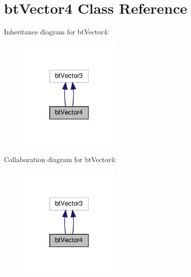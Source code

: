 \hypertarget{classbtVector4}{}\section{bt\+Vector4 Class Reference}
\label{classbtVector4}


Inheritance diagram for bt\+Vector4\+:
\nopagebreak
\begin{figure}[H]
\begin{center}
\leavevmode
\includegraphics[width=139pt]{classbtVector4__inherit__graph}
\end{center}
\end{figure}


Collaboration diagram for bt\+Vector4\+:
\nopagebreak
\begin{figure}[H]
\begin{center}
\leavevmode
\includegraphics[width=139pt]{classbtVector4__coll__graph}
\end{center}
\end{figure}
